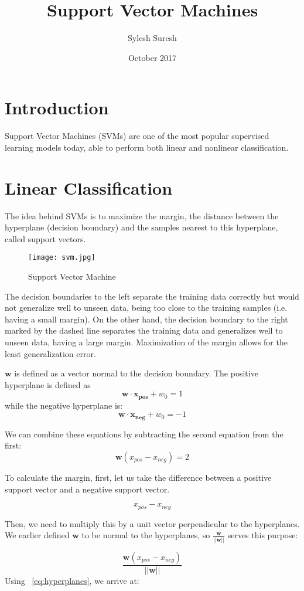 \documentclass{article}
\title{Support Vector Machines}
\author{Sylesh Suresh}
\date{October 2017}
\begin{document}
\maketitle

\section{Introduction}
Support Vector Machines (SVMs) are one of the most popular supervised learning models today, able to perform both linear and nonlinear classification.
\section{Linear Classification}
The idea behind SVMs is to maximize the margin, the distance between the hyperplane (decision boundary) and the samples nearest to this hyperplane, called support vectors. 
\begin{figure}[h!]
\centering
\texttt{[image: svm.jpg]}
\caption{Support Vector Machine}
\label{fig:svm}
\end{figure}
The decision boundaries to the left separate the training data correctly but would not generalize well to unseen data, being too close to the training samples (i.e. having a small margin). On the other hand, the decision boundary to the right marked by the dashed line separates the training data and generalizes well to unseen data, having a large margin. Maximization of the margin allows for the least generalization error.

$\bm{w}$ is defined as a vector normal to the decision boundary. 
The positive hyperplane is defined as
\[ \bm{w \cdot x_{pos}} + w_0 = 1 \]
while the negative hyperplane is:
\[ \bm{w \cdot x_{neg}} + w_0 = -1 \]

We can combine these equations by subtracting the second equation from the first:
\begin{equation} \label{eq:hyperplanes}
\bm{w}{(x_{pos} - x_{neg})} = 2 
\end{equation}

To calculate the margin, first, let us take the difference between a positive support vector and a negative support vector.

\[ x_{pos} - x_{neg} \]

Then, we need to multiply this by a unit vector perpendicular to the hyperplanes. We earlier defined $\bm{w}$ to be normal to the hyperplanes, so $\frac{\bm{w}}{||\bm{w}||}$ serves this purpose:

\[ \frac{\bm{w}(x_{pos} - x_{neg})}{||\bm{w}||} \]
Using ~\ref{eq:hyperplanes}, we arrive at:
\end{document}

